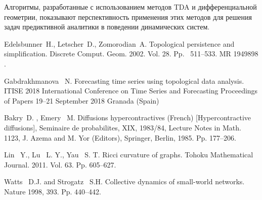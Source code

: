  Алгоритмы, разработанные с использованием методов TDA и дифференциальной геометрии, показывают перспективность применения этих методов для решения задач предиктивной аналитики в поведении динамических систем.





%

\begin{thebibliography}{9} %
 Edelsbunner~H., Letscher~D., Zomorodian~A. Topological persistence and simplification. Discrete Comput. Geom. 2002. Vol. 28. Pp.~ 511–533. MR 1949898 .


 Gabdrakhmanova~ N.  Forecasting time series using topological data analysis. ITISE 2018 International Conference on Time Series and Forecasting Proceedings of Papers 19--21 September 2018 Granada (Spain)

 Bakry~D. , Emery~ M.  Diffusions hypercontractives (French) [Hypercontractive diffusions], Seminaire de probabilites, XIX, 1983/84, Lecture Notes in Math. 1123, J. Azema and M. Yor (Editors), Springer, Berlin, 1985. Pp. 177--206.

 Lin~ Y., Lu~ L. Y., Yau~ S. T. Ricci curvature of graphs. Tohoku Mathematical Journal. 2011. Vol. 63. Pp. 605--627.   

 Watts ~D.J. and Strogatz~ S.H. Collective dynamics of small-world networks. Nature 1998, 393. Pp. 440--442.
\end{thebibliography}




%
